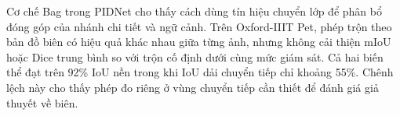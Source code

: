 Cơ chế Bag trong PIDNet cho thấy cách dùng tín hiệu chuyển lớp để phân bổ đóng góp của nhánh chi tiết và ngữ cảnh. Trên Oxford-IIIT Pet, phép trộn theo bản đồ biên có hiệu quả khác nhau giữa từng ảnh, nhưng không cải thiện mIoU hoặc Dice trung bình so với trộn cố định dưới cùng mức giám sát. Cả hai biến thể đạt trên 92\% IoU nền trong khi IoU dải chuyển tiếp chỉ khoảng 55\%. Chênh lệch này cho thấy phép đo riêng ở vùng chuyển tiếp cần thiết để đánh giá giả thuyết về biên.
